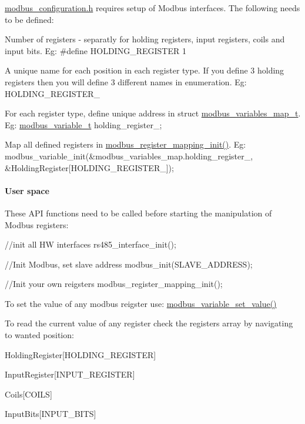 {\ttfamily \mbox{\hyperlink{modbus__configuration_8h}{modbus\+\_\+configuration.\+h}}} requires setup of Modbus interfaces. The following needs to be defined\+:
\begin{DoxyItemize}
\item Number of registers -\/ separatly for holding registers, input registers, coils and input bits. Eg\+: {\ttfamily \#define H\+O\+L\+D\+I\+N\+G\+\_\+\+R\+E\+G\+I\+S\+T\+ER 1}
\item A unique name for each position in each register type. If you define 3 holding registers then you will define 3 different names in enumeration. Eg\+: {\ttfamily H\+O\+L\+D\+I\+N\+G\+\_\+\+R\+E\+G\+I\+S\+T\+E\+R\+\_}
\item For each register type, define unique address in struct \mbox{\hyperlink{structmodbus__variables__map__t}{modbus\+\_\+variables\+\_\+map\+\_\+t}}. Eg\+: {\ttfamily \mbox{\hyperlink{structmodbus__variable__t}{modbus\+\_\+variable\+\_\+t}} holding\+\_\+register\+\_;}
\item Map all defined registers in \mbox{\hyperlink{group___insert_ga6dbaaf108ca00d5dfd1037aadfc10f6f}{modbus\+\_\+register\+\_\+mapping\+\_\+init()}}. Eg\+: {\ttfamily modbus\+\_\+variable\+\_\+init(\&modbus\+\_\+variables\+\_\+map.\+holding\+\_\+register\+\_, \&Holding\+Register\mbox{[}H\+O\+L\+D\+I\+N\+G\+\_\+\+R\+E\+G\+I\+S\+T\+E\+R\+\_\mbox{]});}
\end{DoxyItemize}

\paragraph*{User space}

These A\+PI functions need to be called before starting the manipulation of Modbus registers\+: 
\begin{DoxyCode}
//init all HW interfaces
rs485\_interface\_init();

//Init Modbus, set slave address
modbus\_init(SLAVE\_ADDRESS);

//Init your own reigsters
modbus\_register\_mapping\_init();
\end{DoxyCode}


To set the value of any modbus reigster use\+: {\ttfamily \mbox{\hyperlink{modbus__variable_8c_a393e71af013d703629686bded8e3a1ad}{modbus\+\_\+variable\+\_\+set\+\_\+value()}}}

To read the current value of any register check the register\textquotesingle{}s array by navigating to wanted position\+:
\begin{DoxyItemize}
\item Holding\+Register\mbox{[}H\+O\+L\+D\+I\+N\+G\+\_\+\+R\+E\+G\+I\+S\+T\+ER\mbox{]}
\item Input\+Register\mbox{[}I\+N\+P\+U\+T\+\_\+\+R\+E\+G\+I\+S\+T\+ER\mbox{]}
\item Coils\mbox{[}C\+O\+I\+LS\mbox{]}
\item Input\+Bits\mbox{[}I\+N\+P\+U\+T\+\_\+\+B\+I\+TS\mbox{]} 
\end{DoxyItemize}
